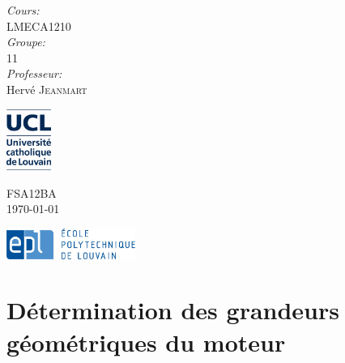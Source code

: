 \documentclass{article}
\begin{document}
\begin{titlepage}
\begin{center}
\begin{minipage}{0.4\textwidth}
\begin{flushleft}
\begin{tabular}{l l}
\end{tabular}
\end{flushleft}
\end{minipage}
\begin{minipage}{0.4\textwidth}
\begin{flushright} \large
\emph{Cours:} \\
LMECA1210\\
\emph{Groupe:} \\
11\\
\emph{Professeur:} \\
Hervé \textsc{Jeanmart}
\end{flushright}
\end{minipage}
\vspace{0.3cm}

\begin{minipage}{0.3\textwidth}
\begin{flushleft}
\includegraphics[height=2cm]{Schema/logo_UCL_NEW_janv2013.JPG}
\end{flushleft}
\end{minipage}
\begin{minipage}{0.3\textwidth}
\begin{center}
{\large FSA12BA}\\
{\large \today}
\end{center}
\end{minipage}
\begin{minipage}{0.3\textwidth}
\begin{flushright}
\includegraphics[height=1cm]{Schema/epl-logo.jpg}
\end{flushright}
\end{minipage}
\end{center}
\end{titlepage}
\tableofcontents



\section{Détermination des grandeurs géométriques du moteur}
\end{document}
